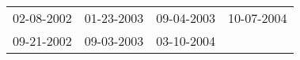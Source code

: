 \begin{supertabular}{llll}
 02-08-2002 &  01-23-2003 &  09-04-2003 &  10-07-2004 \\
 09-21-2002 &  09-03-2003 &  03-10-2004 &             \\
\end{supertabular}
